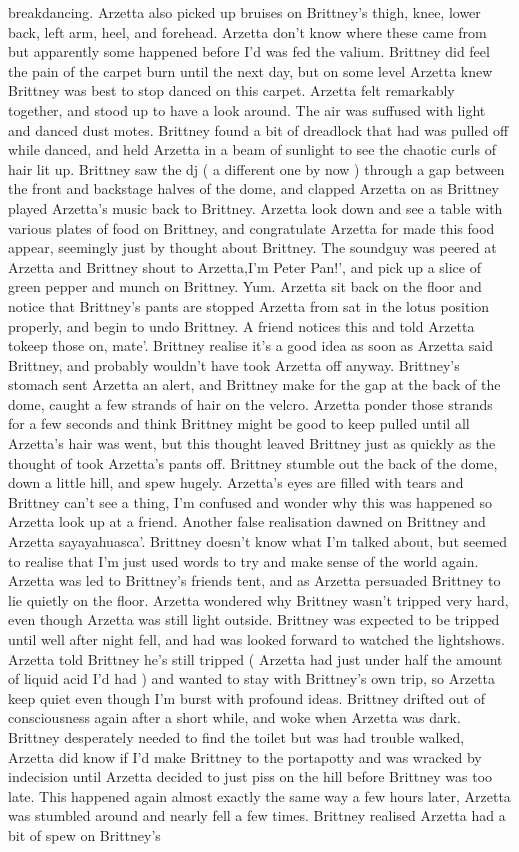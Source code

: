 \documentclass[12pt]{book}
\begin{document}
breakdancing. Arzetta also picked up bruises on Brittney's thigh, knee, lower back, left arm, heel, and forehead. Arzetta don't know where these came from but apparently some happened before I'd was fed the valium. Brittney did feel the pain of the carpet burn until the next day, but on some level Arzetta knew Brittney was best to stop danced on this carpet. Arzetta felt remarkably together, and stood up to have a look around. The air was suffused with light and danced dust motes. Brittney found a bit of dreadlock that had was pulled off while danced, and held Arzetta in a beam of sunlight to see the chaotic curls of hair lit up. Brittney saw the dj ( a different one by now ) through a gap between the front and backstage halves of the dome, and clapped Arzetta on as Brittney played Arzetta's music back to Brittney. Arzetta look down and see a table with various plates of food on Brittney, and congratulate Arzetta for made this food appear, seemingly just by thought about Brittney. The soundguy was peered at Arzetta and Brittney shout to Arzetta,I'm Peter Pan!', and pick up a slice of green pepper and munch on Brittney. Yum. Arzetta sit back on the floor and notice that Brittney's pants are stopped Arzetta from sat in the lotus position properly, and begin to undo Brittney. A friend notices this and told Arzetta tokeep those on, mate'. Brittney realise it's a good idea as soon as Arzetta said Brittney, and probably wouldn't have took Arzetta off anyway. Brittney's stomach sent Arzetta an alert, and Brittney make for the gap at the back of the dome, caught a few strands of hair on the velcro. Arzetta ponder those strands for a few seconds and think Brittney might be good to keep pulled until all Arzetta's hair was went, but this thought leaved Brittney just as quickly as the thought of took Arzetta's pants off. Brittney stumble out the back of the dome, down a little hill, and spew hugely. Arzetta's eyes are filled with tears and Brittney can't see a thing, I'm confused and wonder why this was happened so Arzetta look up at a friend. Another false realisation dawned on Brittney and Arzetta sayayahuasca'. Brittney doesn't know what I'm talked about, but seemed to realise that I'm just used words to try and make sense of the world again. Arzetta was led to Brittney's friends tent, and as Arzetta persuaded Brittney to lie quietly on the floor. Arzetta wondered why Brittney wasn't tripped very hard, even though Arzetta was still light outside. Brittney was expected to be tripped until well after night fell, and had was looked forward to watched the lightshows. Arzetta told Brittney he's still tripped ( Arzetta had just under half the amount of liquid acid I'd had ) and wanted to stay with Brittney's own trip, so Arzetta keep quiet even though I'm burst with profound ideas. Brittney drifted out of consciousness again after a short while, and woke when Arzetta was dark. Brittney desperately needed to find the toilet but was had trouble walked, Arzetta did know if I'd make Brittney to the portapotty and was wracked by indecision until Arzetta decided to just piss on the hill before Brittney was too late. This happened again almost exactly the same way a few hours later, Arzetta was stumbled around and nearly fell a few times. Brittney realised Arzetta had a bit of spew on Brittney's 
\end{document}
